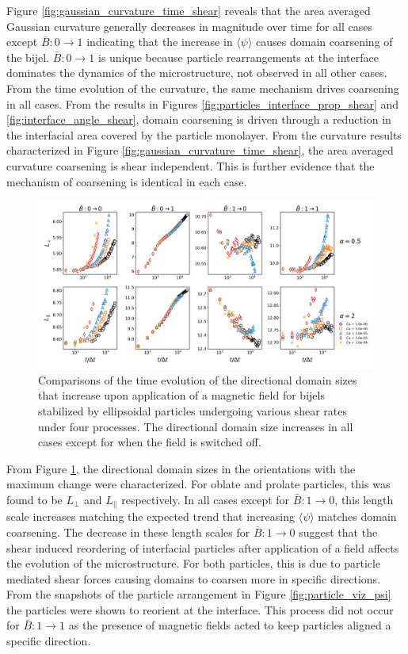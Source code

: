 Figure \ref{fig:gaussian_curvature_time_shear} reveals that the area averaged Gaussian curvature generally decreases in magnitude over time for all cases except 
$\bar{B}: 0 \to 1$ indicating that the increase in $\langle \psi \rangle$ causes domain coarsening of the bijel. $\bar{B}: 0 \to 1$ is
unique because particle rearrangements at the interface dominates the dynamics of the microstructure, not observed in all other
cases. From the time evolution of the curvature, the same mechanism drives coarsening in all cases. From the results in Figures \ref{fig:particles_interface_prop_shear} 
and \ref{fig:interface_angle_shear}, domain coarsening is driven through a reduction in the interfacial area covered by the particle monolayer. 
From the curvature results characterized in Figure \ref{fig:gaussian_curvature_time_shear}, the area averaged curvature coarsening is shear independent. This is further
evidence that the mechanism of coarsening is identical in each case. 

\begin{figure} 
    \centering 
    \includegraphics[scale=0.3]{../figures/results/paper3/anisotropy_compare.png} 
    \caption{Comparisons of the time evolution of the directional domain sizes that increase upon application of a magnetic field for bijels stabilized 
             by ellipsoidal particles undergoing various shear rates under four processes. The directional domain size increases in all cases except for when the
             field is switched off.} 
    \label{fig:domain_size_aniso_time_shear} 
\end{figure}

From Figure \ref{fig:domain_size_aniso_time_shear}, the directional domain sizes in the orientations with the maximum change were characterized. For oblate and prolate 
particles, this was found to be $L_{\perp}$ and $L_{\parallel}$ respectively. In all cases except for $\bar{B}: 1 \to 0$, this length scale increases matching the expected
trend that increasing $\langle \psi \rangle$ matches domain coarsening. The decrease in these length scales for $\bar{B}: 1 \to 0$ suggest that the shear induced
reordering of interfacial particles after application of a field affects the evolution of the microstructure. For both particles, this is due to particle mediated
shear forces causing domains to coarsen more in specific directions. From the snapshots of the particle arrangement in Figure \ref{fig:particle_viz_psi} the particles were
shown to reorient at the interface. This process did not occur for $\bar{B}: 1 \to 1$ as the presence of magnetic fields acted to keep particles aligned a specific
direction. 

